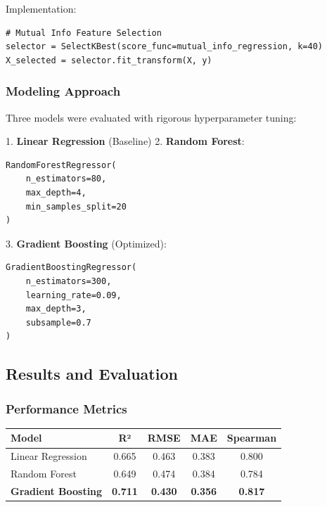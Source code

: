 \documentclass[12pt,a4paper]{article}
\begin{document}
Implementation:
\begin{verbatim}
# Mutual Info Feature Selection
selector = SelectKBest(score_func=mutual_info_regression, k=40)
X_selected = selector.fit_transform(X, y)
\end{verbatim}

\subsubsection{Modeling Approach}
Three models were evaluated with rigorous hyperparameter tuning:

1. \textbf{Linear Regression} (Baseline)
2. \textbf{Random Forest}:
\begin{verbatim}
RandomForestRegressor(
    n_estimators=80,
    max_depth=4,
    min_samples_split=20
)
\end{verbatim}

3. \textbf{Gradient Boosting} (Optimized):
\begin{verbatim}
GradientBoostingRegressor(
    n_estimators=300,
    learning_rate=0.09,
    max_depth=3,
    subsample=0.7
)
\end{verbatim}

\subsection{Results and Evaluation}

\subsubsection{Performance Metrics}
\begin{tabular}{|l|c|c|c|c|}
\hline
\textbf{Model} & \textbf{R²} & \textbf{RMSE} & \textbf{MAE} & \textbf{Spearman} \\
\hline
Linear Regression & 0.665 & 0.463 & 0.383 & 0.800 \\
Random Forest & 0.649 & 0.474 & 0.384 & 0.784 \\
\textbf{Gradient Boosting} & \textbf{0.711} & \textbf{0.430} & \textbf{0.356} & \textbf{0.817} \\
\hline
\end{tabular}
\end{document}
